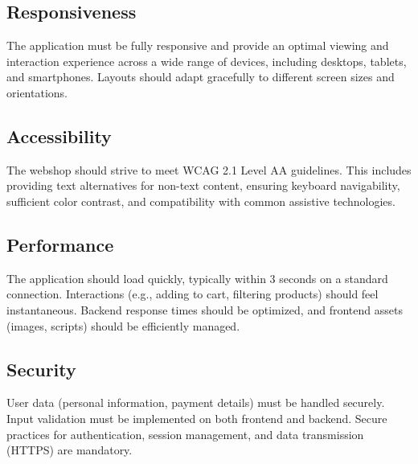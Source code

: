 \documentclass[a4paper,11pt]{article}
\begin{document}
\subsection{Responsiveness}
The application must be fully responsive and provide an optimal viewing and interaction experience across a wide range of devices, including desktops, tablets, and smartphones. Layouts should adapt gracefully to different screen sizes and orientations.

\subsection{Accessibility}
The webshop should strive to meet WCAG 2.1 Level AA guidelines. This includes providing text alternatives for non-text content, ensuring keyboard navigability, sufficient color contrast, and compatibility with common assistive technologies.

\subsection{Performance}
The application should load quickly, typically within 3 seconds on a standard connection. Interactions (e.g., adding to cart, filtering products) should feel instantaneous. Backend response times should be optimized, and frontend assets (images, scripts) should be efficiently managed.

\subsection{Security}
User data (personal information, payment details) must be handled securely. Input validation must be implemented on both frontend and backend. Secure practices for authentication, session management, and data transmission (HTTPS) are mandatory.
\end{document}

